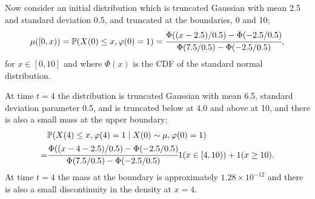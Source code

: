 \begin{example}\label{ex: wave 6}
	Now consider an initial distribution which is truncated Gaussian with mean 2.5 and standard deviation 0.5, and truncated at the boundaries, 0 and 10;
	\begin{align}
		\mu([0,x)) = \mathbb P(X(0)\leq x, \varphi(0)=1)=\cfrac{\Phi((x-2.5)/0.5)-\Phi(-2.5/0.5)}{\Phi(7.5/0.5)-\Phi(-2.5/0.5)}, \label{eqn: kdjfksdf}
	\end{align}
	for \(x\in[0,10]\) and where \(\Phi(x)\) is the CDF of the standard normal distribution.

	At time \(t=4\) the distribution is truncated Gaussian with mean 6.5, standard deviation parameter 0.5, and is truncated below at 4.0 and above at 10, and there is also a small mass at the upper boundary; 
	\begin{align}
		\nonumber & \mathbb P(X(4)\leq x, \varphi(4)=1\mid X(0)\sim\mu, \varphi(0)=1)  
		\\=&\cfrac{\Phi((x-4-2.5)/0.5)-\Phi(-2.5/0.5)}{\Phi(7.5/0.5)-\Phi(-2.5/0.5)}1(x\in[4,10)) 
		+ 1(x\geq 10).\label{eqn: bbbbbaabbaa}%
	\end{align}
	At time \(t=4\) the mass at the boundary is approximately \(1.28\times 10^{-12}\) and there is also a small discontinuity in the density at \(x=4\).


\end{example}
